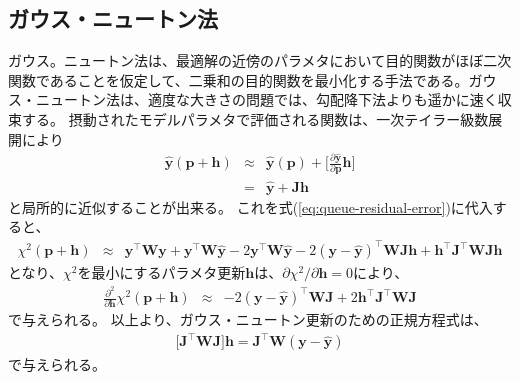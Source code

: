 \documentclass[titlepage]{jsreport}
\begin{document}
\subsection{ガウス・ニュートン法}\label{principle-subsec:gauss-newton}
ガウス。ニュートン法は、最適解の近傍のパラメタにおいて目的関数がほぼ二次関数であることを仮定して\cite{gauss-newton-objective-function}、二乗和の目的関数を最小化する手法である。ガウス・ニュートン法は、適度な大きさの問題では、勾配降下法よりも遥かに速く収束する\cite{gauss-newton}。
摂動されたモデルパラメタで評価される関数は、一次テイラー級数展開により
\large
\begin{eqnarray}
\hat{\bm{y}}(\bm{p}+\bm{h})&\approx&\hat{\bm{y}}(\bm{p})+\Bigg[\frac{\partial\hat{\bm{y}}}{\partial\bm{p}}\bm{h}\Bigg] \nonumber\\
                           &=&\hat{\bm{y}}+\bm{J}\bm{h} \label{gauss-newton_model-parameter}
\end{eqnarray}
\normalsize
と局所的に近似することが出来る。
これを式(\ref{eq:queue-residual-error})に代入すると、
\large
\begin{eqnarray}
\chi^2(\bm{p}+\bm{h}) &\approx& \bm{y}^\top\bm{W}\bm{y}+\bm{y}^\top\bm{W}\hat{\bm{y}}-2\bm{y}^\top\bm{W}\hat{\bm{y}}-2(\bm{y}-\bm{\hat{y}})^\top\bm{W}\bm{J}\bm{h}+\bm{h}^\top\bm{J}^\top\bm{W}\bm{J}\bm{h}
\end{eqnarray}
\normalsize
となり、$\chi^2$を最小にするパラメタ更新$\bm{h}$は、${\partial\chi^2}/{\partial\bm{h}}=0$により、
\large
\begin{eqnarray}
\frac{\partial^2}{\partial\bm{h}}\chi^2(\bm{p}+\bm{h}) &\approx& -2(\bm{y}-\bm{\hat{y}})^\top\bm{W}\bm{J}+2\bm{h}^\top\bm{J}^\top\bm{W}\bm{J}
\end{eqnarray}
\normalsize
で与えられる。
以上より、ガウス・ニュートン更新のための正規方程式は、
\large
\begin{eqnarray}
\Big[\bm{J}^\top\bm{W}\bm{J}\Big]\bm{h} = \bm{J}^\top\bm{W}(\bm{y}-\bm{\hat{y}})
\end{eqnarray}
\normalsize
で与えられる\cite{gradient-descent_gauss-newton_levenberg-marquardt}。
\end{document}
